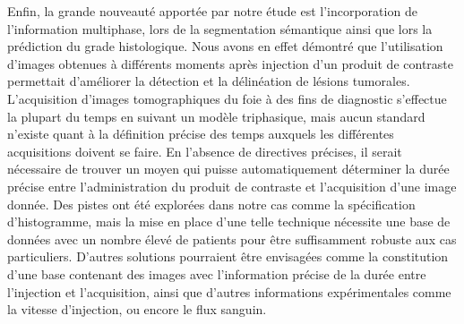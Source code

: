 \documentclass[]{memoir}
\begin{document}
Enfin, la grande nouveauté apportée par notre étude est l’incorporation de l’information multiphase, lors de la segmentation sémantique ainsi que lors la prédiction du grade histologique. Nous avons en effet démontré que l’utilisation d’images obtenues à différents moments après injection d’un produit de contraste permettait d’améliorer la détection et la délinéation de lésions tumorales. L’acquisition d’images tomographiques du foie à des fins de diagnostic s’effectue la plupart du temps en suivant un modèle triphasique, mais aucun standard n’existe quant à la définition précise des temps auxquels les différentes acquisitions doivent se faire. En l’absence de directives précises, il serait nécessaire de trouver un moyen qui puisse automatiquement déterminer la durée précise entre l’administration du produit de contraste et l’acquisition d’une image donnée. Des pistes ont été explorées dans notre cas comme la spécification d’histogramme, mais la mise en place d’une telle technique nécessite une base de données avec un nombre élevé de patients pour être suffisamment robuste aux cas particuliers. D’autres solutions pourraient être envisagées comme la constitution d’une base contenant des images avec l’information précise de la durée entre l’injection et l’acquisition, ainsi que d’autres informations expérimentales comme la vitesse d’injection, ou encore le flux sanguin.


\newpage
%
\printbibliography[heading=bibintoc]
\end{document}
